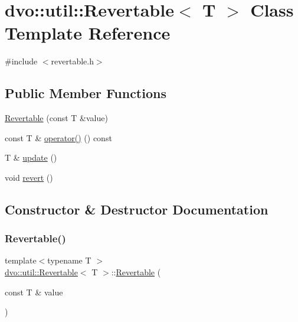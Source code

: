\hypertarget{classdvo_1_1util_1_1_revertable}{}\section{dvo\+:\+:util\+:\+:Revertable$<$ T $>$ Class Template Reference}
\label{classdvo_1_1util_1_1_revertable}


{\ttfamily \#include $<$revertable.\+h$>$}

\subsection*{Public Member Functions}
\begin{DoxyCompactItemize}
\item 
\mbox{\hyperlink{classdvo_1_1util_1_1_revertable_a5b791252e99ca8dab9a682a1b4981dd0}{Revertable}} (const T \&value)
\item 
const T \& \mbox{\hyperlink{classdvo_1_1util_1_1_revertable_ae583fea5c2d9f3e248f8f1d7bcdfd3d3}{operator()}} () const
\item 
T \& \mbox{\hyperlink{classdvo_1_1util_1_1_revertable_a09344cd96395e5e63ab57d33dbab55cf}{update}} ()
\item 
void \mbox{\hyperlink{classdvo_1_1util_1_1_revertable_ac4130b746441cb5d449d0ae24f6889f3}{revert}} ()
\end{DoxyCompactItemize}


\subsection{Constructor \& Destructor Documentation}
\mbox{\label{classdvo_1_1util_1_1_revertable_a5b791252e99ca8dab9a682a1b4981dd0}} 
\subsubsection{\texorpdfstring{Revertable()}{Revertable()}}
{\footnotesize\ttfamily template$<$typename T $>$ \\
\mbox{\hyperlink{classdvo_1_1util_1_1_revertable}{dvo\+::util\+::\+Revertable}}$<$ T $>$\+::\mbox{\hyperlink{classdvo_1_1util_1_1_revertable}{Revertable}} (\begin{DoxyParamCaption}\item[{const T \&}]{value }\end{DoxyParamCaption})\hspace{0.3cm}{\ttfamily [inline]}}



